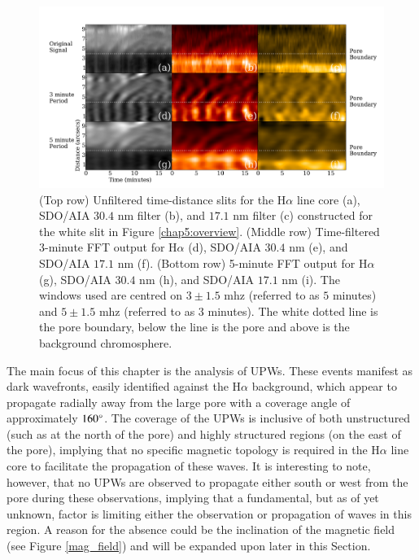 	\begin{figure}
		\centering
		\includegraphics[width=\textwidth]{slits.pdf}
		\caption
		{
		(Top row) Unfiltered time-distance slits for the H$\alpha$ line core (a), SDO/AIA $30.4$ nm filter (b), and $17.1$ nm filter (c) constructed for the white slit in Figure \ref{chap5:overview}. (Middle row) Time-filtered 3-minute FFT output for H$\alpha$ (d), SDO/AIA $30.4$ nm (e), and SDO/AIA $17.1$ nm (f). (Bottom row) 5-minute FFT output for H$\alpha$ (g), SDO/AIA $30.4$ nm (h), and SDO/AIA $17.1$ nm (i).
		The windows used are centred on $3\pm1.5$ mhz (referred to as $5$ minutes) and $5\pm1.5$ mhz (referred to as $3$ minutes).
		The white dotted line is the pore boundary, below the line is the pore and above is the background chromosphere.
		}
		\label{fft_slit}
	\end{figure}

	The main focus of this chapter is the analysis of UPWs.
	These events manifest as dark wavefronts, easily identified against the H$\alpha$ background, which appear to propagate radially away from the large pore with a coverage angle of approximately $160\degree$.
	The coverage of the UPWs is inclusive of both unstructured (such as at the north of the pore) and highly structured regions (on the east of the pore), implying that no specific magnetic topology is required in the H$\alpha$ line core to facilitate the propagation of these waves.
	It is interesting to note, however, that no UPWs are observed to propagate either south or west from the pore during these observations, implying that a fundamental, but as of yet unknown, factor is limiting either the observation or propagation of waves in this region.
	A reason for the absence could be the inclination of the magnetic field (see Figure \ref{mag_field}) and will be expanded upon later in this Section.

